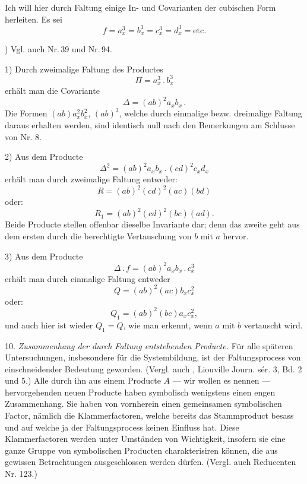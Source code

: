 \documentclass[11pt]{article}
\providecommand{\gesperrt}[1]{\textls[130]{#1}}
\providecommand{\weberpage}[1]{}
\let\Delta\varDelta
\let\Pi\varPi
\begin{document}
Ich will hier durch Faltung einige In- und Covarianten der cubischen
Form herleiten. Es sei
\[
f = a_x^3 = b_x^3 = c_x^3 = d_x^3 = \text{etc.}
\]

\medskip
\noindent *) Vgl. auch Nr.\,39 und Nr.\,94.


\weberpage{11}
1) Durch zweimalige Faltung des Productes
\[
\Pi = a_x^3 \,.\, b_x^3
\]
erhält man die Covariante
\[
\Delta = (ab)^2 a_x b_x \,.
\]
Die Formen $(ab) a_x^2 b_x^2$, $(ab)^3$, welche durch einmalige bezw.
dreimalige Faltung daraus erhalten werden, sind identisch null nach
den Bemerkungen am Schlusse von Nr. 8.

2) Aus dem Producte
\[
\Delta^2 = (ab)^2 a_x b_x \,.\, (cd)^2 c_x d_x
\]
erhält man durch zweimalige Faltung entweder:
\[
R = (ab)^2 (cd)^2 (ac) (bd)
\]
oder:
\[
R_1 = (ab)^2 (cd)^2 (bc) (ad) .
\]
Beide Producte stellen offenbar dieselbe Invariante dar; denn das
zweite geht aus dem ersten durch die berechtigte Vertauschung von $b$
mit $a$ hervor.

3) Aus dem Producte
\[
\Delta \,.\, f = (ab)^2 a_x b_x \,.\, c_x^3
\]
erhält man durch einmalige Faltung entweder
\[
Q = (ab)^2 (ac) b_x c_x^2
\]
oder:
\[
Q_1 = (ab)^2 (bc) a_x c_x^2 ,
\]
und auch hier ist wieder $Q_1 = Q$, wie man erkennt, wenn $a$ mit $b$
vertauscht wird.

10. \textit{Zusammenhang der durch Faltung entstehenden Producte.}
Für alle späteren Untersuchungen, insbesondere für die
Systembildung, ist der Faltungsprocess von einschneidender Bedeutung
geworden. (Vergl. auch \gesperrt{Camille Jordan}, Liouville Journ.
sér. 3, Bd. 2 und 5.) Alle durch ihn aus einem Producte $A$ — wir
wollen es \gesperrt{Stammproduct} nennen — hervorgehenden neuen
Producte haben symbolisch wenigstens einen engen Zusammenhang. Sie
haben von vornherein einen gemeinsamen symbolischen Factor, nämlich
die Klammerfactoren, welche bereits das Stammproduct besass und auf
welche ja der Faltungsprocess keinen Einfluss hat. Diese
Klammerfactoren werden unter Umständen von Wichtigkeit, insofern sie
eine ganze Gruppe von symbolischen Producten charakterisiren können,
die aus gewissen Betrachtungen ausgeschlossen werden dürfen. (Vergl.
auch \glqq Reducenten\grqq{} Nr. 123.)
\end{document}
